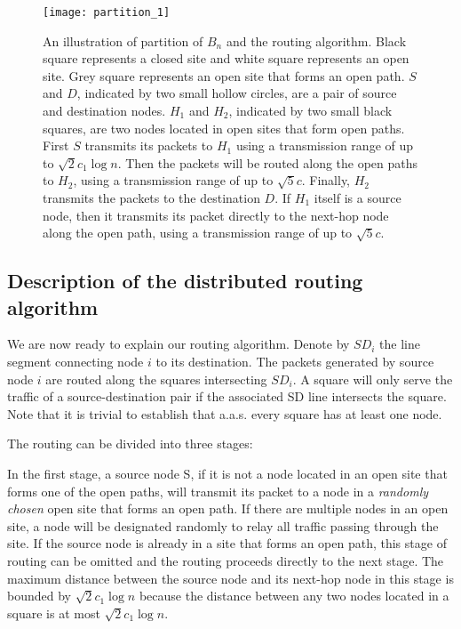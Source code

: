 \documentclass[english]{IEEEtran}
\theoremstyle{plain}
\theoremstyle{plain}
\theoremstyle{plain}
\theoremstyle{remark}
\begin{document}
\begin{figure}
\begin{centering}
\texttt{[image: partition\_1]}
\par\end{centering}

\protect\caption{\label{fig:partition}An illustration of partition of $B_{n}$ and
the routing algorithm. Black square represents a closed site and white
square represents an open site. Grey square represents an open site
that forms an open path. $S$ and $D$, indicated by two small hollow
circles, are a pair of source and destination nodes. $H_{1}$ and
$H_{2}$, indicated by two small black squares, are two nodes located
in open sites that form open paths. First $S$ transmits its packets
to $H_{1}$ using a transmission range of up to $\sqrt{2}c_{1}\log n$.
Then the packets will be routed along the open paths to $H_{2}$,
using a transmission range of up to $\sqrt{5}c$. Finally, $H_{2}$
transmits the packets to the destination $D$. If $H_{1}$ itself
is a source node, then it transmits its packet directly to the next-hop
node along the open path, using a transmission range of up to $\sqrt{5}c$. }
\end{figure}



\subsection{Description of the distributed routing algorithm}

We are now ready to explain our routing algorithm. Denote by $SD_{i}$
the line segment connecting node $i$ to its destination. The packets
generated by source node $i$ are routed along the squares intersecting
$SD_{i}$. A square will only serve the traffic of a source-destination
pair if the associated SD line intersects the square. Note that it
is trivial to establish that a.a.s. every square has at least one
node. 

The routing can be divided into three stages:

In the first stage, a source node S, if it is not a node located in
an open site that forms one of the open paths, will transmit its packet
to a node in a \emph{randomly chosen} open site that forms an open
path. If there are multiple nodes in an open site, a node will be
designated randomly to relay all traffic passing through the site.
If the source node is already in a site that forms an open path, this
stage of routing can be omitted and the routing proceeds directly
to the next stage. The maximum distance between the source node and
its next-hop node in this stage is bounded by $\sqrt{2}c_{1}\log n$
because the distance between any two nodes located in a square is
at most $\sqrt{2}c_{1}\log n$. 
\end{document}
